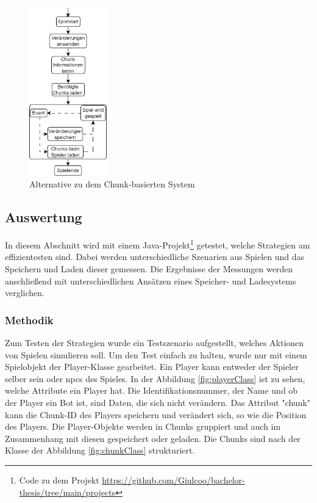 \begin{figure}[htp]
    \centering
    \includegraphics[width=0.3\textwidth]{images/Chunkbasiert2.png}
    \caption{Alternative zu dem Chunk-basierten System}
    \label{fig:altchunkBasedSystem}
\end{figure}


\subsection{Auswertung}
In diesem Abschnitt wird mit einem Java-Projekt\footnote{Code zu dem Projekt \url{https://github.com/Giulcoo/bachelor-thesis/tree/main/projects}} getestet, welche Strategien am effizientesten sind. Dabei werden unterschiedliche Szenarien aus Spielen und das Speichern und Laden dieser gemessen. Die Ergebnisse der Messungen werden anschließend mit unterschiedlichen Ansätzen eines Speicher- und Ladesystems verglichen. 

\subsubsection{Methodik}
Zum Testen der Strategien wurde ein Testszenario aufgestellt, welches Aktionen von Spielen simulieren soll. Um den Test einfach zu halten, wurde nur mit einem Spielobjekt der Player-Klasse gearbeitet. Ein Player kann entweder der Spieler selber sein oder \acp{npc} des Spieles. In der Abbildung \ref{fig:playerClass} ist zu sehen, welche Attribute ein Player hat. Die Identifikationsnummer, der Name und ob der Player ein Bot ist, sind Daten, die sich nicht verändern. Das Attribut "chunk" kann die Chunk-ID des Players speichern und verändert sich, so wie die Position des Players. Die Player-Objekte werden in Chunks gruppiert und auch im Zusammenhang mit diesen gespeichert oder geladen. Die Chunks sind nach der Klasse der Abbildung \ref{fig:chunkClass} strukturiert.

